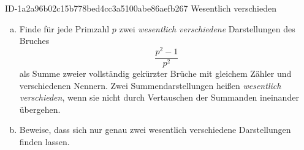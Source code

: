 \begin{exercise}
      {ID-1a2a96b02c15b778bed4cc3a5100abe86aefb267}
      {Wesentlich verschieden}
  \ifproblem\problem
    \begin{enumerate}[a)]
      \item Finde für jede Primzahl $p$ zwei \emph{wesentlich verschiedene}
            Darstellungen des Bruches
            \begin{equation*}
              \frac{p^{2}-1}{p^{2}}
            \end{equation*}
            als Summe zweier vollständig gekürzter Brüche mit gleichem Zähler und
            verschiedenen Nennern. Zwei Summendarstellungen heißen \emph{wesentlich
            verschieden}, wenn sie nicht durch Vertauschen der Summanden ineinander
            übergehen.
      \item Beweise, dass sich nur genau zwei wesentlich verschiedene Darstellungen
            finden lassen.
    \end{enumerate}
  \fi
\end{exercise}
